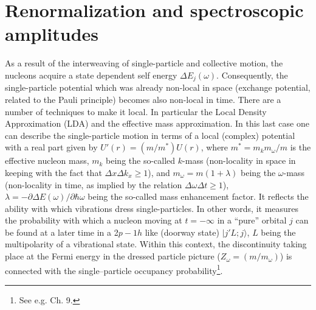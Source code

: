 \section{Renormalization and spectroscopic amplitudes}\label{S3.2}
As a result of the interweaving of single-particle and collective motion, the nucleons acquire a state dependent self energy $\Delta E_j(\omega)$.   Consequently, the single-particle potential which was already non-local in space (exchange potential, related to the Pauli principle) becomes also non-local in time. There are a number of techniques to make it local. In particular the Local Density Approximation (LDA) and the effective mass approximation. In this last case one can describe the single-particle motion in terms of a local (complex) potential with a real part given by $U'(r)=(m/m^*)U(r)$, where $m^*=m_km_\omega/m$ is the effective nucleon mass, $m_k$ being the so-called $k$-mass (non-locality in space in keeping with the fact that $\Delta x\Delta k_x\geq1$), and $m_\omega=m(1+\lambda)$ being the $\omega$-mass (non-locality in time, as implied by the relation $\Delta \omega\Delta t\geq1$),  $\lambda=-\partial \Delta E(\omega)/\partial \hbar \omega$ being the so-called mass enhancement factor. It reflects the ability with which vibrations dress single-particles. In other words, it measures the probability with which a nucleon moving at  $t=-\infty$ in a ``pure'' orbital $j$ can be found at a later time in a 2$p-1h$ like (doorway state) $|j'L;j\rangle$, $L$ being the multipolarity of a vibrational state. Within this context, the discontinuity taking place at the Fermi energy in the dressed particle picture ($Z_\omega=(m/m_\omega)$) is connected with the single--particle occupancy probability\footnote{See e.g. \cite{Brink:05} Ch. 9.}.


